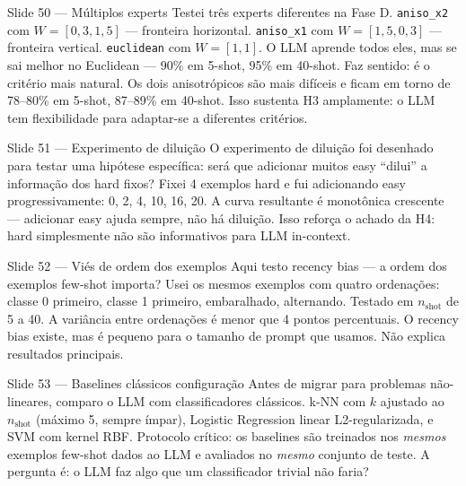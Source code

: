 \documentclass[aspectratio=169,10pt]{beamer}
\begin{document}
\begin{frame}{Slide 50 --- M\'ultiplos experts}
\footnotesize
Testei tr\^es experts diferentes na Fase D. \texttt{aniso\_x2} com $W=[0{,}3, 1{,}5]$ --- fronteira horizontal. \texttt{aniso\_x1} com $W=[1{,}5, 0{,}3]$ --- fronteira vertical. \texttt{euclidean} com $W=[1, 1]$. O LLM aprende todos eles, mas se sai melhor no Euclidean --- 90\% em 5-shot, 95\% em 40-shot. Faz sentido: \'e o crit\'erio mais natural. Os dois anisotr\'opicos s\~ao mais dif\'iceis e ficam em torno de 78--80\% em 5-shot, 87--89\% em 40-shot. Isso sustenta H3 amplamente: o LLM tem flexibilidade para adaptar-se a diferentes crit\'erios.
\end{frame}

\begin{frame}{Slide 51 --- Experimento de dilui\c{c}\~ao}
\footnotesize
O experimento de dilui\c{c}\~ao foi desenhado para testar uma hip\'otese espec\'ifica: ser\'a que adicionar muitos easy ``dilui'' a informa\c{c}\~ao dos hard fixos? Fixei 4 exemplos hard e fui adicionando easy progressivamente: 0, 2, 4, 10, 16, 20. A curva resultante \'e monot\^onica crescente --- adicionar easy ajuda sempre, n\~ao h\'a dilui\c{c}\~ao. Isso refor\c{c}a o achado da H4: hard simplesmente n\~ao s\~ao informativos para LLM in-context.
\end{frame}

\begin{frame}{Slide 52 --- Vi\'es de ordem dos exemplos}
\footnotesize
Aqui testo recency bias --- a ordem dos exemplos few-shot importa? Usei os mesmos exemplos com quatro ordena\c{c}\~oes: classe 0 primeiro, classe 1 primeiro, embaralhado, alternando. Testado em $n_{\text{shot}}$ de 5 a 40. A vari\^ancia entre ordena\c{c}\~oes \'e menor que 4 pontos percentuais. O recency bias existe, mas \'e pequeno para o tamanho de prompt que usamos. N\~ao explica resultados principais.
\end{frame}

\begin{frame}{Slide 53 --- Baselines cl\'assicos configura\c{c}\~ao}
\footnotesize
Antes de migrar para problemas n\~ao-lineares, comparo o LLM com classificadores cl\'assicos. k-NN com $k$ ajustado ao $n_{\text{shot}}$ (m\'aximo 5, sempre \'impar), Logistic Regression linear L2-regularizada, e SVM com kernel RBF. Protocolo cr\'itico: os baselines s\~ao treinados nos \emph{mesmos} exemplos few-shot dados ao LLM e avaliados no \emph{mesmo} conjunto de teste. A pergunta \'e: o LLM faz algo que um classificador trivial n\~ao faria?
\end{frame}
\end{document}

